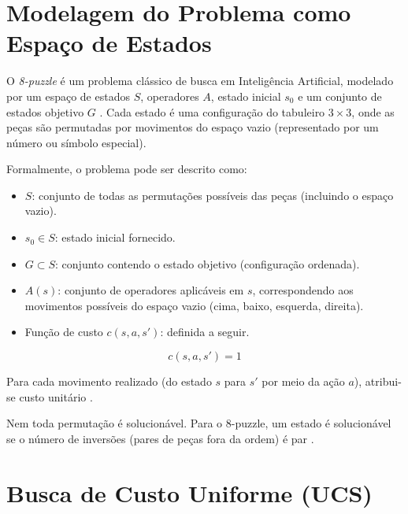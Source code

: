   
\section{Modelagem do Problema como Espaço de Estados}  
  
O \emph{8-puzzle} é um problema clássico de busca em Inteligência Artificial, modelado por um espaço de estados $S$, operadores $A$, estado inicial $s_0$ e um conjunto de estados objetivo $G$ \cite{russell2010artificial}. Cada estado é uma configuração do tabuleiro $3\times 3$, onde as peças são permutadas por movimentos do espaço vazio (representado por um número ou símbolo especial).  
  
Formalmente, o problema pode ser descrito como:  
\begin{itemize}  
    \item $S$: conjunto de todas as permutações possíveis das peças (incluindo o espaço vazio).  
    \item $s_0 \in S$: estado inicial fornecido.  
    \item $G \subset S$: conjunto contendo o estado objetivo (configuração ordenada).  
    \item $A(s)$: conjunto de operadores aplicáveis em $s$, correspondendo aos movimentos possíveis do espaço vazio (cima, baixo, esquerda, direita).  
    \item Função de custo $c(s, a, s')$: definida a seguir.  
\end{itemize}  
  
\begin{equation}  
    c(s, a, s') = 1  
\end{equation}  
  
\noindent  
Para cada movimento realizado (do estado $s$ para $s'$ por meio da ação $a$), atribui-se custo unitário \cite{russell2010artificial}.  
  
Nem toda permutação é solucionável. Para o 8-puzzle, um estado é solucionável se o número de inversões (pares de peças fora da ordem) é par \cite{nilsson1998}.  
  
\section{Busca de Custo Uniforme (UCS)}  
  

